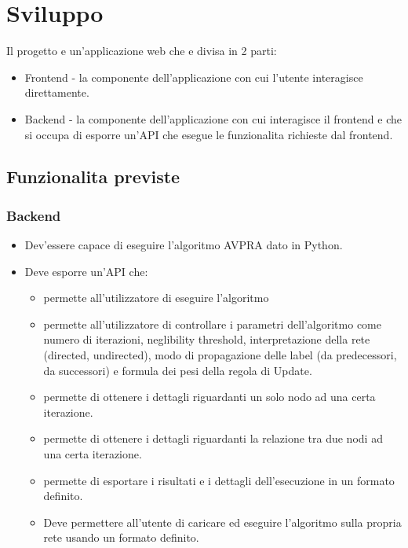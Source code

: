 \documentclass[a4paper,12pt]{report}
\begin{document}
	\section{Sviluppo}
		Il progetto e un'applicazione web che e divisa in 2 parti:
		\begin{itemize}
		\item Frontend - la componente dell'applicazione con cui l'utente interagisce direttamente.
		\item Backend - la componente dell'applicazione con cui interagisce il frontend e che si occupa di esporre un'API che esegue le funzionalita richieste dal frontend.
		\end{itemize}
		\subsection{Funzionalita previste}
			\subsubsection{Backend}
			\begin{itemize}
				\item Dev'essere capace di eseguire l'algoritmo AVPRA dato in Python.
				\item Deve esporre un'API che:
				\begin{itemize}
					\item permette all'utilizzatore di eseguire l'algoritmo
					\item permette all'utilizzatore di controllare i parametri dell'algoritmo come numero di iterazioni, neglibility threshold, interpretazione della rete (directed, undirected), modo di propagazione delle label (da predecessori, da successori) e formula dei pesi della regola di Update.
					\item permette di ottenere i dettagli riguardanti un solo nodo ad una certa iterazione.
					\item permette di ottenere i dettagli riguardanti la relazione tra due nodi ad una certa iterazione.
					\item permette di esportare i risultati e i dettagli dell'esecuzione in un formato definito.
					\item Deve permettere all'utente di caricare ed eseguire l'algoritmo sulla propria rete usando un formato definito.
				\end{itemize}
			\end{itemize}
\end{document}
